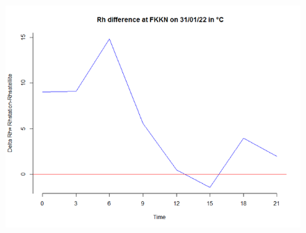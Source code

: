 \begin{figure}[H]
\begin{center}
\includegraphics[scale=0.6]{rhh2.png} %
\end{center}
\end{figure}

